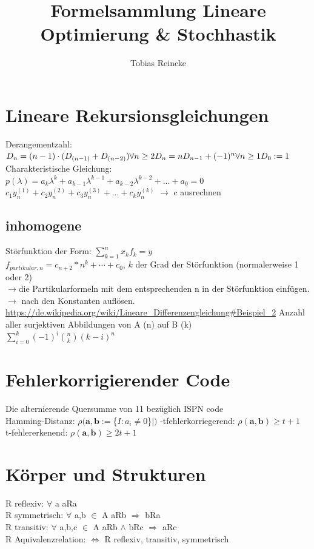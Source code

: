 \documentclass[]{article}
\title{Formelsammlung Lineare Optimierung \& Stochhastik}
\author{Tobias Reincke}
\date{}
\begin{document}
\setlength{\parindent}{0pt} 

\addtolength{\textwidth}{1.0in}
\addtolength{\textheight}{1.00in}
\addtolength{\evensidemargin}{-0.75in}
\addtolength{\oddsidemargin}{-0.75in}
\addtolength{\topmargin}{-.50in}

\newcommand{\set}[1]{$\{$#1$\}$  }

\section{Lineare Rekursionsgleichungen}
Derangementzahl: $D_n =(n-1)\cdot(D_{(n-1)}+D_{(n-2)})  \forall n \geq 2\\
D_n=nD_{n-1}+(-1)^n \forall n\geq 1\\ D_0:=1$\\
Charakteristische Gleichung: $p(\lambda)=a_k \lambda^k + a_{k-1} \lambda^{k-1} + a_{k-2} \lambda^{k-2}+ ... + a_0=0$ \\
$c_1 y_n^{ (1) }+c_2 y_n^{(2)}+c_3 y_n^{(3)}+...+c_k y_n^{(k)}$ $\rightarrow$ c ausrechnen 
\subsection{inhomogene}
Störfunktion der Form: $\sum_{k=1}^{n} x_kf_{k}=y$\\
$f_{partikular,n}= c_{n+2}*n^k+\cdots+c_{0}$, $k$ der Grad der Störfunktion (normalerweise 1 oder 2)\\
$\rightarrow$die Partikularformeln mit dem entsprechenden n in der Störfunktion einfügen.\\
$\rightarrow$ nach den Konstanten auflösen.\\
\url{https://de.wikipedia.org/wiki/Lineare_Differenzengleichung#Beispiel_2}
Anzahl aller surjektiven Abbildungen von A (n) auf B (k) \\ \centering
$\sum_{i=0}^{k} (-1)^i  \binom{n}{k} (k-i)^n$
\\
\section{Fehlerkorrigierender Code}
Die alternierende Quersumme von 11 bezüglich ISPN code\\
Hamming-Distanz: $\rho(\mathbf{a,b}:= \set{I:a_i\neq0}|)$
-tfehlerkorriegerend: $\rho(\mathbf{a,b}) \geq t+1$\\
t-fehlererkenend: $\rho(\mathbf{a,b}) \geq 2t+1$
\section{Körper und Strukturen}
R reflexiv: $\forall$ a aRa \\
R symmetrisch: $\forall$ a,b $\in$ A   aRb $\Rightarrow$ bRa \\
R transitiv: $\forall$ a,b,c $\in$ A aRb $\land$ bRc $\Rightarrow$ aRc \\
R Aquivalenzrelation: $\Leftrightarrow$ R reflexiv, transitiv, symmetrisch \\
\end{document}
